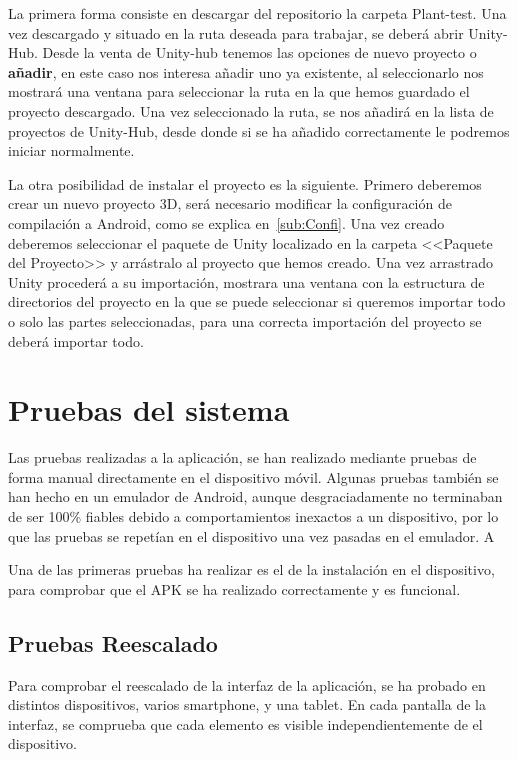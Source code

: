 La primera forma consiste en descargar del repositorio la carpeta Plant-test. Una vez descargado y situado en la ruta deseada para trabajar, se deberá abrir Unity-Hub. Desde la venta de Unity-hub tenemos las opciones de nuevo proyecto o \textbf{añadir}, en este caso nos interesa añadir uno ya existente, al seleccionarlo nos mostrará una ventana para seleccionar la ruta en la que hemos guardado el proyecto descargado. Una vez seleccionado la ruta, se nos añadirá en la lista de proyectos de Unity-Hub, desde donde si se ha añadido correctamente le podremos iniciar normalmente.


La otra posibilidad de instalar el proyecto es la siguiente. Primero deberemos crear un nuevo proyecto 3D, será necesario modificar la configuración de compilación a Android, como se explica en~\ref{sub:Confi}. Una vez creado deberemos seleccionar el paquete de Unity localizado en la carpeta <<Paquete del Proyecto>> y arrástralo al proyecto que hemos creado. Una vez arrastrado Unity procederá a su importación, mostrara una ventana con la estructura de directorios del proyecto en la que se puede seleccionar si queremos importar todo o solo las partes seleccionadas, para una correcta importación del proyecto se deberá importar todo.


\section{Pruebas del sistema}
Las pruebas realizadas a la aplicación, se han realizado mediante pruebas de forma manual directamente en el dispositivo móvil. Algunas pruebas también se han hecho en un emulador de Android, aunque desgraciadamente no terminaban de ser 100\% fiables debido a comportamientos inexactos a un dispositivo, por lo que las pruebas se repetían en el dispositivo una vez pasadas en el emulador. A

Una de las primeras pruebas ha realizar es el de la instalación en el dispositivo, para comprobar que el APK se ha realizado correctamente y es funcional. 

\subsection{Pruebas Reescalado}
Para comprobar el reescalado de la interfaz de la aplicación, se ha probado en distintos dispositivos, varios smartphone, y una tablet. En cada pantalla de la interfaz, se comprueba que cada elemento es visible independientemente de el dispositivo.


